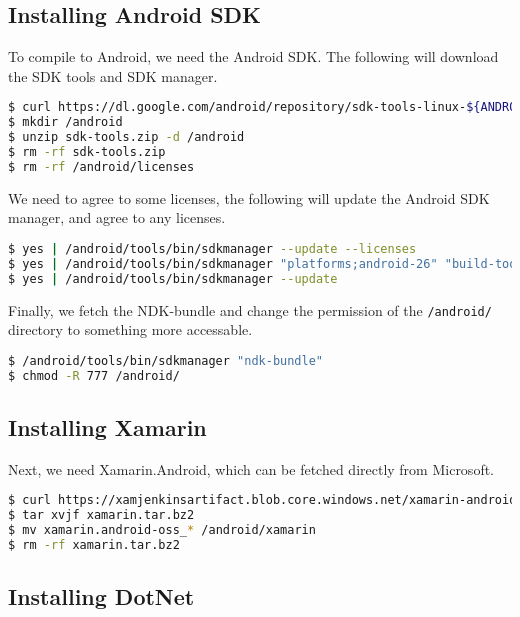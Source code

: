 \subsection{Installing Android SDK}

To compile to Android, we need the Android SDK. The following will
download the SDK tools and SDK manager.

\begin{lstlisting}[language=bash]
$ curl https://dl.google.com/android/repository/sdk-tools-linux-${ANDROID_SDK_TOOLS_VERSION}.zip -o sdk-tools.zip
$ mkdir /android
$ unzip sdk-tools.zip -d /android
$ rm -rf sdk-tools.zip
$ rm -rf /android/licenses
\end{lstlisting}

We need to agree to some licenses, the following will update the Android
SDK manager, and agree to any licenses.

\begin{lstlisting}[language=bash]
$ yes | /android/tools/bin/sdkmanager --update --licenses
$ yes | /android/tools/bin/sdkmanager "platforms;android-26" "build-tools;27.0.3"
$ yes | /android/tools/bin/sdkmanager --update
\end{lstlisting}

Finally, we fetch the NDK-bundle and change the permission of the
\lstinline{/android/} directory to something more
accessable.

\begin{lstlisting}[language=bash]
$ /android/tools/bin/sdkmanager "ndk-bundle"
$ chmod -R 777 /android/
\end{lstlisting}

\subsection{Installing Xamarin}

Next, we need Xamarin.Android, which can be fetched directly from
Microsoft.

\begin{lstlisting}[language=bash]
$ curl https://xamjenkinsartifact.blob.core.windows.net/xamarin-android/xamarin-android/xamarin.android-oss_${XAMARIN_VERSION}.orig.tar.bz2 -o xamarin.tar.bz2
$ tar xvjf xamarin.tar.bz2
$ mv xamarin.android-oss_* /android/xamarin
$ rm -rf xamarin.tar.bz2
\end{lstlisting}

\subsection{Installing DotNet}

